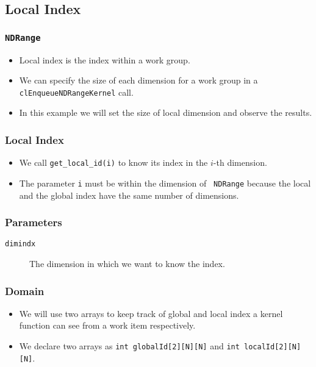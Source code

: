 \documentclass{beamer}
\begin{document}
\subsection{Local Index}

\begin{frame}
  \frametitle{\tt NDRange} 
  \begin{itemize}
    \item Local index is the index within a work group.
    \item We can specify the size of each dimension for a work group
      in a {\tt clEnqueueNDRangeKernel} call.
    \item In this example we will set the size of local dimension and
      observe the results.
  \end{itemize}
\end{frame}

\begin{frame}
  \frametitle{Local Index}
  \begin{itemize}
    \item We call {\tt get\_local\_id(i)} to know its index in the
      $i$-th dimension.
    \item The parameter {\tt i} must be within the dimension of {\tt
      NDRange} because the local and the global index have the same
      number of dimensions.
  \end{itemize}
\end{frame}

\begin{frame}
\end{frame}

\begin{frame}
  \frametitle{Parameters}
  \begin{description}
  \item [\tt dimindx] The dimension in which we want to know the
    index.
  \end{description}
\end{frame}

\begin{frame}
  \frametitle{Domain}
  \begin{itemize}
    \item We will use two arrays to keep track of global and local
      index a kernel function can see from a work item respectively.
    \item We declare two arrays as {\tt int globalId[2][N][N]} and
      {\tt int localId[2][N][N]}.
  \end{itemize}
\end{frame}
\end{document}
